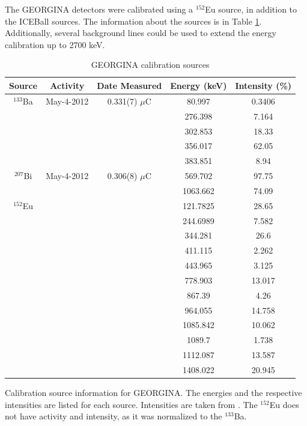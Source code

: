 The GEORGINA detectors were calibrated using a $^{152}$Eu source, in addition to the ICEBall sources. The information about the sources is in Table \ref{tab:GEORGINA_Cal_Source}. Additionally, several background lines could be used to extend the energy calibration up to 2700 keV. 

\begin{table}[]
    \centering
    \caption{GEORGINA calibration sources}
    \begin{tabular}{c|c|c|c|c} \toprule
         Source & Activity & Date Measured & Energy (keV) & Intensity (\%)\\
          \hline 
         $^{133}$Ba & May-4-2012 & 0.331(7) $\mu$C & 80.997 & 0.3406 \\
         & & & 276.398 & 7.164 \\
         & & & 302.853 & 18.33 \\
         & & & 356.017 & 62.05 \\
         & & & 383.851 & 8.94 \\
         \hline
         $^{207}$Bi & May-4-2012 & 0.306(8) $\mu$C & 569.702 & 97.75 \\ 
         & & & 1063.662 & 74.09 \\
         \hline
         $^{152}$Eu & & & 121.7825 & 28.65 \\
         & & & 244.6989 & 7.582 \\
         & & & 344.281 & 26.6 \\
         & & & 411.115 & 2.262 \\
         & & & 443.965 & 3.125 \\
         & & & 778.903 & 13.017 \\
         & & & 867.39 & 4.26 \\
         & & & 964.055 & 14.758 \\
         & & & 1085.842 & 10.062 \\
         & & & 1089.7 & 1.738 \\
         & & & 1112.087 & 13.587 \\
         & & & 1408.022 & 20.945 \\\bottomrule
    \end{tabular}
    \footnotesize
    \item Calibration source information for GEORGINA. The energies and the respective intensities are listed for each source. Intensities are taken from \cite{trzaska90:_calibration}. The  $^{152}$Eu does not have activity and intensity, as it was normalized to the $^{133}$Ba.
    \label{tab:GEORGINA_Cal_Source}
\end{table}

